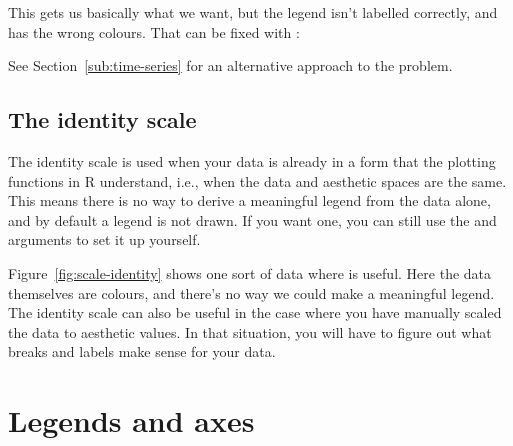 This gets us basically what we want, but the legend isn't labelled correctly, and has the wrong colours.  That can be fixed with :

% 


See Section~\ref{sub:time-series} for an alternative approach to the problem.

\subsection{The identity scale}
\label{sub:scale-identity}

The identity scale is used when your data is already in a form that the plotting functions in R understand, i.e., when the data and aesthetic spaces are the same.  This means there is no way to derive a meaningful legend from the data alone, and by default a legend is not drawn.  If you want one, you can still use the  and  arguments to set it up yourself.

Figure~\ref{fig:scale-identity} shows one sort of data where  is useful.  Here the data themselves are colours, and there's no way we could make a meaningful legend.  The identity scale can also be useful in the case where you have manually scaled the data to aesthetic values.  In that situation, you will have to figure out what breaks and labels make sense for your data.

% 


\section{Legends and axes}
\label{sec:guides}


